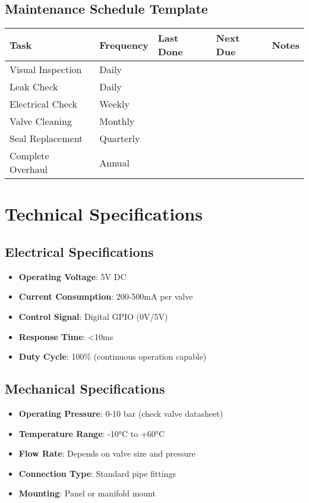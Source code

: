 \documentclass[11pt,a4paper]{article}
\begin{document}
\subsection{Maintenance Schedule Template}

\begin{longtable}{|p{3cm}|p{2cm}|p{2cm}|p{2cm}|p{4cm}|}
\hline
\textbf{Task} & \textbf{Frequency} & \textbf{Last Done} & \textbf{Next Due} & \textbf{Notes} \\
\hline
\endhead
Visual Inspection & Daily & & & \\
\hline
Leak Check & Daily & & & \\
\hline
Electrical Check & Weekly & & & \\
\hline
Valve Cleaning & Monthly & & & \\
\hline
Seal Replacement & Quarterly & & & \\
\hline
Complete Overhaul & Annual & & & \\
\hline
\end{longtable}

\section{Technical Specifications}

\subsection{Electrical Specifications}
\begin{itemize}
    \item \textbf{Operating Voltage}: 5V DC
    \item \textbf{Current Consumption}: 200-500mA per valve
    \item \textbf{Control Signal}: Digital GPIO (0V/5V)
    \item \textbf{Response Time}: <10ms
    \item \textbf{Duty Cycle}: 100\% (continuous operation capable)
\end{itemize}

\subsection{Mechanical Specifications}
\begin{itemize}
    \item \textbf{Operating Pressure}: 0-10 bar (check valve datasheet)
    \item \textbf{Temperature Range}: -10°C to +60°C
    \item \textbf{Flow Rate}: Depends on valve size and pressure
    \item \textbf{Connection Type}: Standard pipe fittings
    \item \textbf{Mounting}: Panel or manifold mount
\end{itemize}
\end{document}
